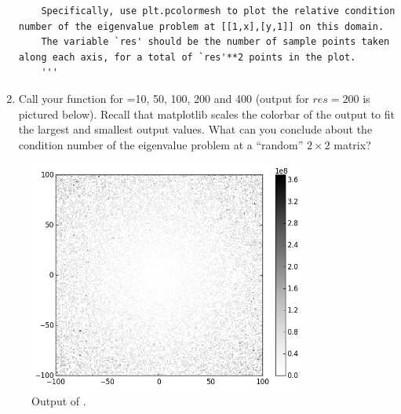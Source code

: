 \begin{problem}[Optional]
\begin{enumerate}
\begin{lstlisting}
    Specifically, use plt.pcolormesh to plot the relative condition number of the eigenvalue problem at [[1,x],[y,1]] on this domain.
    The variable `res' should be the number of sample points taken along each axis, for a total of `res'**2 points in the plot.
    '''
\end{lstlisting}
\item Call your function for =10, 50, 100, 200 and 400 (output for $res=200$ is pictured below). Recall that matplotlib scales the colorbar of the output to fit the largest and smallest output values.
What can you conclude about the condition number of the eigenvalue problem at a ``random'' $2\times2$ matrix?
\end{enumerate}
\begin{figure}[H]
\includegraphics[height=3in]{eigenvalue_conditioning.png}
\caption{Output of .}
\end{figure}
\end{problem}

%
%
%

